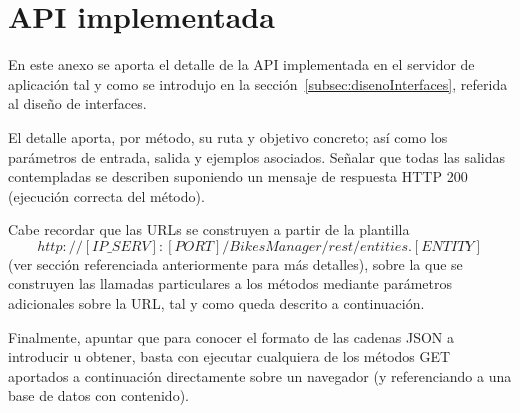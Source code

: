 \chapter{API implementada}
\label{app:appAPI}

En este anexo se aporta el detalle de la API implementada en el servidor de aplicación tal y como se introdujo en la sección~\ref{subsec:disenoInterfaces}, referida al diseño de interfaces.

El detalle aporta, por método, su ruta y objetivo concreto; así como los parámetros de entrada, salida y ejemplos asociados. Señalar que todas las salidas contempladas se describen suponiendo un mensaje de respuesta HTTP 200 (ejecución correcta del método).

Cabe recordar que las URLs se construyen a partir de la plantilla $$http://[IP\_SERV]:[PORT]/BikesManager/rest/entities.[ENTITY]$$ (ver sección referenciada anteriormente para más detalles), sobre la que se construyen las llamadas particulares a los métodos mediante parámetros adicionales sobre la URL, tal y como queda descrito a continuación.

Finalmente, apuntar que para conocer el formato de las cadenas JSON a introducir u obtener, basta con ejecutar cualquiera de los métodos GET aportados a continuación directamente sobre un navegador (y referenciando a una base de datos con contenido).



